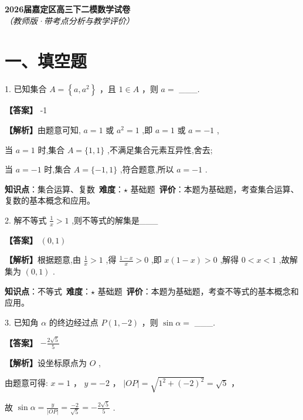 \documentclass[10pt]{article}
\begin{document}
\begin{center}
\Large\textbf{2026届嘉定区高三下二模数学试卷}\\[0.5em]
\normalsize\textit{（教师版·带考点分析与教学评价）}
\end{center}

\section*{一、填空题}

1. 已知集合 \(A = \left\{  {a,{a}^{2}}\right\}\) ，且 \(1 \in  A\) ，则 \(a =\) ___.

\textbf{【答案】} -1

\textbf{【解析】}由题意可知, \(a = 1\) 或 \({a}^{2} = 1\) ,即 \(a = 1\) 或 \(a =  - 1\) ,

当 \(a = 1\) 时,集合 \(A = \{ 1,1\}\) ,不满足集合元素互异性,舍去;

当 \(a =  - 1\) 时,集合 \(A = \{  - 1,1\}\) ,符合题意,所以 \(a =  - 1\) .

\begin{analysisbox}[考点分析]
\textbf{知识点}：集合运算、复数\
\textbf{难度}：$\star$ 基础题\
\textbf{评价}：本题为基础题，考查集合运算、复数的基本概念和应用。
\end{analysisbox}

2. 解不等式 \(\frac{1}{x} > 1\) ,则不等式的解集是___

\textbf{【答案】} \(\left( {0,1}\right)\)

\textbf{【解析】}根据题意,由 \(\frac{1}{x} > 1\) ,得 \(\frac{1 - x}{x} > 0\) ,即 \(x\left( {1 - x}\right)  > 0\) ,解得 \(0 < x < 1\) ,故解集为 \(\left( {0,1}\right)\) .

\begin{analysisbox}[考点分析]
\textbf{知识点}：不等式\
\textbf{难度}：$\star$ 基础题\
\textbf{评价}：本题为基础题，考查不等式的基本概念和应用。
\end{analysisbox}

3. 已知角 \(\alpha\) 的终边经过点 \(P\left( {1, - 2}\right)\) ，则 \(\sin \alpha  =\) ___.

\textbf{【答案】} \(- \frac{2\sqrt{5}}{5}\)

\textbf{【解析】}设坐标原点为 \(O\) ,

由题意可得: \(x = 1\) ， \(y =  - 2\) ， \(\left| {OP}\right|  = \sqrt{{1}^{2} + {\left( -2\right) }^{2}} = \sqrt{5}\) ，

故 \(\sin \alpha  = \frac{y}{\left| OP\right| } = \frac{-2}{\sqrt{5}} =  - \frac{2\sqrt{5}}{5}\) .
\end{document}

